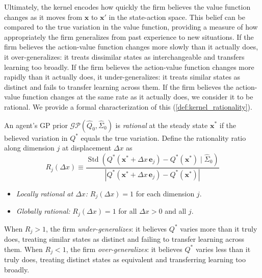 Ultimately, the kernel encodes how quickly the firm believes the value function changes 
as it moves from $\mathbf{x}$ to $\mathbf{x}'$ in the state-action space. This belief
can be compared to the true variation in the value function, providing a measure of
how appropriately the firm generalizes from past experience to new situations.
If the firm believes the action-value function changes more slowly than it actually does,
it over-generalizes: it treats dissimilar states as interchangeable and transfers learning
too broadly. If the firm believes the action-value function changes more rapidly than it
actually does, it under-generalizes: it treats similar states as distinct and fails to
transfer learning across them. If the firm believes the action-value function changes 
at the same rate as it actually does, we consider it to be rational.
We provide a formal characterization of this (\ref{def:kernel_rationality}).

\begin{definition} \label{def:kernel_rationality}
An agent's GP prior $\mathcal{GP}(\hat{Q}_0, \hat{\Sigma}_0)$ is 
\textit{rational} at the steady state $\mathbf{x}^*$ if the 
believed variation in $Q^*$ equals the true variation. Define the 
rationality ratio along dimension $j$ at displacement 
$\Delta x$ as
\begin{equation}
    R_j(\Delta x) \equiv 
\frac{\operatorname{Std}\left( 
    Q^*(\mathbf{x}^* + \Delta x \, \mathbf{e}_j) 
- Q^*(\mathbf{x}^*) \mid \hat{\Sigma}_0 \right)}
    {\left| Q^*(\mathbf{x}^* + \Delta x \, \mathbf{e}_j) 
- Q^*(\mathbf{x}^*) \right|}
\end{equation}
\begin{itemize}
\item[i)] \textit{Locally rational at $\Delta x$:} 
$R_j(\Delta x) = 1$ for each dimension $j$.
\item[ii)] \textit{Globally rational:} 
$R_j(\Delta x) = 1$ for all $\Delta x > 0$ and all $j$.
\end{itemize}
When $R_j > 1$, the firm \textit{under-generalizes}: it believes $Q^*$ varies more 
than it truly does, treating similar states as distinct and failing to transfer 
learning across them. When $R_j < 1$, the firm \textit{over-generalizes}: it believes 
$Q^*$ varies less than it truly does, treating distinct states as equivalent and 
transferring learning too broadly.
\end{definition}

